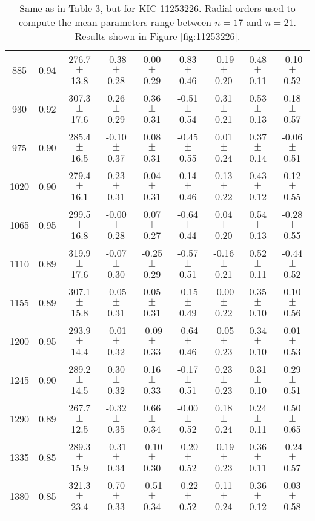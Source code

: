 \documentclass[twocolumn]{aastex61}%
\begin{document}
\begin{table*}[ht]
\begin{tabular}{ccc|ccccc|c}
885 & 0.94 & 276.7 $\pm$ 13.8 & -0.38 $\pm$ 0.28 & 0.00 $\pm$ 0.29 & 0.83 $\pm$ 0.46 & -0.19 $\pm$ 0.20 & 0.48 $\pm$ 0.11 & -0.10 $\pm$ 0.52\\
930 & 0.92 & 307.3 $\pm$ 17.6 & 0.26 $\pm$ 0.29 & 0.36 $\pm$ 0.31 & -0.51 $\pm$ 0.54 & 0.31 $\pm$ 0.21 & 0.53 $\pm$ 0.13 & 0.18 $\pm$ 0.57\\
975 & 0.90 & 285.4 $\pm$ 16.5 & -0.10 $\pm$ 0.37 & 0.08 $\pm$ 0.31 & -0.45 $\pm$ 0.55 & 0.01 $\pm$ 0.24 & 0.37 $\pm$ 0.14 & -0.06 $\pm$ 0.51\\
1020 & 0.90 & 279.4 $\pm$ 16.1 & 0.23 $\pm$ 0.31 & 0.04 $\pm$ 0.31 & 0.14 $\pm$ 0.46 & 0.13 $\pm$ 0.22 & 0.43 $\pm$ 0.12 & 0.12 $\pm$ 0.55\\
1065 & 0.95 & 299.5 $\pm$ 16.8 & -0.00 $\pm$ 0.28 & 0.07 $\pm$ 0.27 & -0.64 $\pm$ 0.44 & 0.04 $\pm$ 0.20 & 0.54 $\pm$ 0.13 & -0.28 $\pm$ 0.55\\
1110 & 0.89 & 319.9 $\pm$ 17.6 & -0.07 $\pm$ 0.30 & -0.25 $\pm$ 0.29 & -0.57 $\pm$ 0.51 & -0.16 $\pm$ 0.21 & 0.52 $\pm$ 0.11 & -0.44 $\pm$ 0.52\\
1155 & 0.89 & 307.1 $\pm$ 15.8 & -0.05 $\pm$ 0.31 & 0.05 $\pm$ 0.31 & -0.15 $\pm$ 0.49 & -0.00 $\pm$ 0.22 & 0.35 $\pm$ 0.10 & 0.10 $\pm$ 0.56\\
1200 & 0.95 & 293.9 $\pm$ 14.4 & -0.01 $\pm$ 0.32 & -0.09 $\pm$ 0.33 & -0.64 $\pm$ 0.46 & -0.05 $\pm$ 0.23 & 0.34 $\pm$ 0.10 & 0.01 $\pm$ 0.53\\
1245 & 0.90 & 289.2 $\pm$ 14.5 & 0.30 $\pm$ 0.32 & 0.16 $\pm$ 0.33 & -0.17 $\pm$ 0.51 & 0.23 $\pm$ 0.23 & 0.31 $\pm$ 0.10 & 0.29 $\pm$ 0.51\\
1290 & 0.89 & 267.7 $\pm$ 12.5 & -0.32 $\pm$ 0.35 & 0.66 $\pm$ 0.34 & -0.00 $\pm$ 0.52 & 0.18 $\pm$ 0.24 & 0.24 $\pm$ 0.11 & 0.50 $\pm$ 0.65\\
1335 & 0.85 & 289.3 $\pm$ 15.9 & -0.31 $\pm$ 0.34 & -0.10 $\pm$ 0.30 & -0.20 $\pm$ 0.52 & -0.19 $\pm$ 0.23 & 0.36 $\pm$ 0.11 & -0.24 $\pm$ 0.57\\
1380 & 0.85 & 321.3 $\pm$ 23.4 & 0.70 $\pm$ 0.33 & -0.51 $\pm$ 0.34 & -0.22 $\pm$ 0.52 & 0.11 $\pm$ 0.24 & 0.36 $\pm$ 0.12 & 0.03 $\pm$ 0.58\\
\end{tabular}
\caption{Same as in Table 3, but for KIC 11253226. Radial orders used to compute the mean parameters range between $n=17$ and $n=21$. Results shown in Figure \ref{fig:11253226}.}\label{tab:11253226}\vspace{-1.5cm}
\end{table*}
\end{document}
